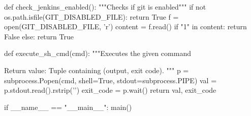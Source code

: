 \begin{pythoncode}[caption=Pre-receive git hook for checking for common mistakes (written in Python)]
def check_jenkins_enabled():
    """Checks if git is enabled"""
    if not os.path.isfile(GIT_DISABLED_FILE):
        return True
    f = open(GIT_DISABLED_FILE, 'r')
    content = f.read()
    if "1" in content:
        return False
    else:
        return True

def execute_sh_cmd(cmd):
    """Executes the given command

    Return value: Tuple containing (output, exit code).
    """
    p = subprocess.Popen(cmd, shell=True, stdout=subprocess.PIPE)
    val = p.stdout.read().rstrip('\n')
    exit_code = p.wait()
    return val, exit_code


if __name__ == "__main__":
    main()
\end{pythoncode}